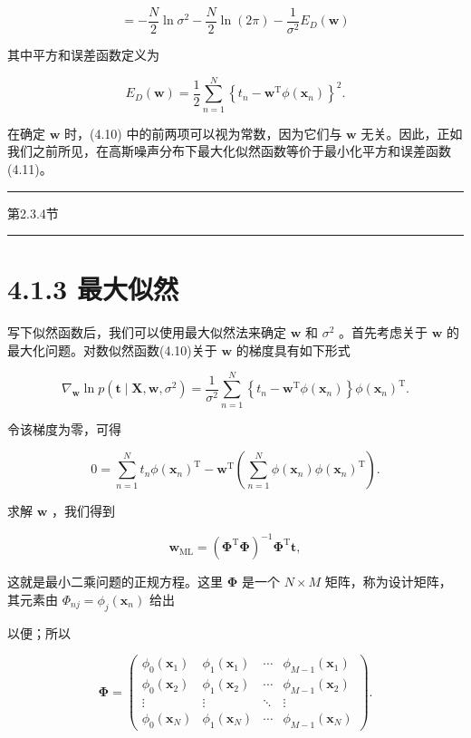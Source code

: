 \documentclass[10pt]{report}
\newcommand{\HRule}{\begin{center}\rule{0.9\linewidth}{0.2mm}\end{center}}
\begin{document}
\[
=  - \frac{N}{2}\ln {\sigma }^{2} - \frac{N}{2}\ln \left( {2\pi }\right)  - \frac{1}{{\sigma }^{2}}{E}_{D}\left( \mathbf{w}\right)  \tag{4.10}
\]

其中平方和误差函数定义为

\[
{E}_{D}\left( \mathbf{w}\right)  = \frac{1}{2}\mathop{\sum }\limits_{{n = 1}}^{N}{\left\{  {t}_{n} - {\mathbf{w}}^{\mathrm{T}}\phi \left( {\mathbf{x}}_{n}\right) \right\}  }^{2}. \tag{4.11}
\]

在确定 \(\mathbf{w}\) 时，(4.10) 中的前两项可以视为常数，因为它们与 \(\mathbf{w}\) 无关。因此，正如我们之前所见，在高斯噪声分布下最大化似然函数等价于最小化平方和误差函数 (4.11)。

\HRule

第2.3.4节

\HRule

\section*{4.1.3 最大似然}

写下似然函数后，我们可以使用最大似然法来确定 \(\mathbf{w}\) 和 \({\sigma }^{2}\) 。首先考虑关于 \(\mathbf{w}\) 的最大化问题。对数似然函数(4.10)关于 \(\mathbf{w}\) 的梯度具有如下形式

\[
{\nabla }_{\mathbf{w}}\ln p\left( {\mathbf{t} \mid  \mathbf{X},\mathbf{w},{\sigma }^{2}}\right)  = \frac{1}{{\sigma }^{2}}\mathop{\sum }\limits_{{n = 1}}^{N}\left\{  {{t}_{n} - {\mathbf{w}}^{\mathrm{T}}\phi \left( {\mathbf{x}}_{n}\right) }\right\}  \phi {\left( {\mathbf{x}}_{n}\right) }^{\mathrm{T}}. \tag{4.12}
\]

令该梯度为零，可得

\[
0 = \mathop{\sum }\limits_{{n = 1}}^{N}{t}_{n}\phi {\left( {\mathbf{x}}_{n}\right) }^{\mathrm{T}} - {\mathbf{w}}^{\mathrm{T}}\left( {\mathop{\sum }\limits_{{n = 1}}^{N}\phi \left( {\mathbf{x}}_{n}\right) \phi {\left( {\mathbf{x}}_{n}\right) }^{\mathrm{T}}}\right) . \tag{4.13}
\]

求解 \(\mathbf{w}\) ，我们得到

\[
{\mathbf{w}}_{\mathrm{{ML}}} = {\left( {\mathbf{\Phi }}^{\mathrm{T}}\mathbf{\Phi }\right) }^{-1}{\mathbf{\Phi }}^{\mathrm{T}}\mathbf{t}, \tag{4.14}
\]

这就是最小二乘问题的正规方程。这里 \(\mathbf{\Phi }\) 是一个 \(N \times  M\) 矩阵，称为设计矩阵，其元素由 \({\Phi }_{nj} = {\phi }_{j}\left( {\mathbf{x}}_{n}\right)\) 给出

以便；所以

\[
\mathbf{\Phi } = \left( \begin{matrix} {\phi }_{0}\left( {\mathbf{x}}_{1}\right) & {\phi }_{1}\left( {\mathbf{x}}_{1}\right) & \cdots & {\phi }_{M - 1}\left( {\mathbf{x}}_{1}\right) \\  {\phi }_{0}\left( {\mathbf{x}}_{2}\right) & {\phi }_{1}\left( {\mathbf{x}}_{2}\right) & \cdots & {\phi }_{M - 1}\left( {\mathbf{x}}_{2}\right) \\  \vdots & \vdots &  \ddots  & \vdots \\  {\phi }_{0}\left( {\mathbf{x}}_{N}\right) & {\phi }_{1}\left( {\mathbf{x}}_{N}\right) & \cdots & {\phi }_{M - 1}\left( {\mathbf{x}}_{N}\right)  \end{matrix}\right) . \tag{4.15}
\]
\end{document}

